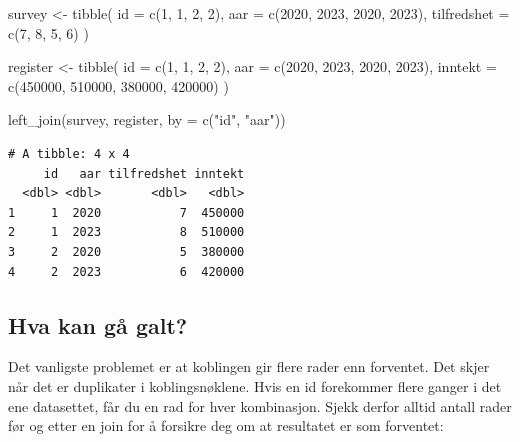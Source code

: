 \documentclass[
  norsk,
  letterpaper,
  DIV=11,
  numbers=noendperiod]{scrreprt}
\newenvironment{Shaded}{\begin{snugshade}}{\end{snugshade}}
\newcommand{\AttributeTok}[1]{\textcolor[rgb]{0.40,0.45,0.13}{#1}}
\newcommand{\DecValTok}[1]{\textcolor[rgb]{0.68,0.00,0.00}{#1}}
\newcommand{\FunctionTok}[1]{\textcolor[rgb]{0.28,0.35,0.67}{#1}}
\newcommand{\NormalTok}[1]{\textcolor[rgb]{0.00,0.23,0.31}{#1}}
\newcommand{\OtherTok}[1]{\textcolor[rgb]{0.00,0.23,0.31}{#1}}
\newcommand{\StringTok}[1]{\textcolor[rgb]{0.13,0.47,0.30}{#1}}
\theoremstyle{definition}
\theoremstyle{remark}
\begin{document}
\begin{Shaded}
\begin{Highlighting}[]
\NormalTok{survey }\OtherTok{\textless{}{-}} \FunctionTok{tibble}\NormalTok{(}
  \AttributeTok{id =} \FunctionTok{c}\NormalTok{(}\DecValTok{1}\NormalTok{, }\DecValTok{1}\NormalTok{, }\DecValTok{2}\NormalTok{, }\DecValTok{2}\NormalTok{),}
  \AttributeTok{aar =} \FunctionTok{c}\NormalTok{(}\DecValTok{2020}\NormalTok{, }\DecValTok{2023}\NormalTok{, }\DecValTok{2020}\NormalTok{, }\DecValTok{2023}\NormalTok{),}
  \AttributeTok{tilfredshet =} \FunctionTok{c}\NormalTok{(}\DecValTok{7}\NormalTok{, }\DecValTok{8}\NormalTok{, }\DecValTok{5}\NormalTok{, }\DecValTok{6}\NormalTok{)}
\NormalTok{)}

\NormalTok{register }\OtherTok{\textless{}{-}} \FunctionTok{tibble}\NormalTok{(}
  \AttributeTok{id =} \FunctionTok{c}\NormalTok{(}\DecValTok{1}\NormalTok{, }\DecValTok{1}\NormalTok{, }\DecValTok{2}\NormalTok{, }\DecValTok{2}\NormalTok{),}
  \AttributeTok{aar =} \FunctionTok{c}\NormalTok{(}\DecValTok{2020}\NormalTok{, }\DecValTok{2023}\NormalTok{, }\DecValTok{2020}\NormalTok{, }\DecValTok{2023}\NormalTok{),}
  \AttributeTok{inntekt =} \FunctionTok{c}\NormalTok{(}\DecValTok{450000}\NormalTok{, }\DecValTok{510000}\NormalTok{, }\DecValTok{380000}\NormalTok{, }\DecValTok{420000}\NormalTok{)}
\NormalTok{)}

\FunctionTok{left\_join}\NormalTok{(survey, register, }\AttributeTok{by =} \FunctionTok{c}\NormalTok{(}\StringTok{"id"}\NormalTok{, }\StringTok{"aar"}\NormalTok{))}
\end{Highlighting}
\end{Shaded}

\begin{verbatim}
# A tibble: 4 x 4
     id   aar tilfredshet inntekt
  <dbl> <dbl>       <dbl>   <dbl>
1     1  2020           7  450000
2     1  2023           8  510000
3     2  2020           5  380000
4     2  2023           6  420000
\end{verbatim}

\subsection{Hva kan gå galt?}\label{hva-kan-guxe5-galt}

Det vanligste problemet er at koblingen gir flere rader enn forventet.
Det skjer når det er duplikater i koblingsnøklene. Hvis en id forekommer
flere ganger i det ene datasettet, får du en rad for hver kombinasjon.
Sjekk derfor alltid antall rader før og etter en join for å forsikre deg
om at resultatet er som forventet:
\end{document}
